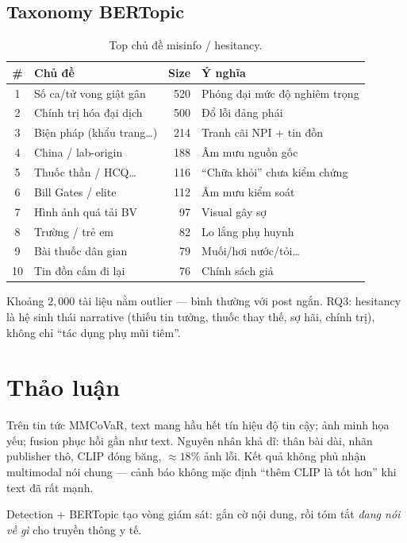 \documentclass[12pt, a4paper]{report}
\begin{document}
\subsection{Taxonomy BERTopic}

\begin{table}[htbp]
\centering
\caption{Top chủ đề misinfo / hesitancy.}
\label{tab:taxonomy}
\small
\begin{tabular}{clrp{4.8cm}}
\hline
\# & Chủ đề & Size & Ý nghĩa \\
\hline
1 & Số ca/tử vong giật gân & 520 & Phóng đại mức độ nghiêm trọng \\
2 & Chính trị hóa đại dịch & 500 & Đổ lỗi đảng phái \\
3 & Biện pháp (khẩu trang\ldots) & 214 & Tranh cãi NPI + tin đồn \\
4 & China / lab-origin & 188 & Âm mưu nguồn gốc \\
5 & Thuốc thần / HCQ\ldots & 116 & ``Chữa khỏi'' chưa kiểm chứng \\
6 & Bill Gates / elite & 112 & Âm mưu kiểm soát \\
7 & Hình ảnh quá tải BV & 97 & Visual gây sợ \\
8 & Trường / trẻ em & 82 & Lo lắng phụ huynh \\
9 & Bài thuốc dân gian & 79 & Muối/hơi nước/tỏi\ldots \\
10 & Tin đồn cấm đi lại & 76 & Chính sách giả \\
\hline
\end{tabular}
\end{table}

Khoảng $2{,}000$ tài liệu nằm outlier --- bình thường với post ngắn.
RQ3: hesitancy là hệ sinh thái narrative (thiếu tin tưởng, thuốc thay thế, sợ hãi, chính trị), không chỉ ``tác dụng phụ mũi tiêm''.

\section{Thảo luận}
\label{sec:discussion}

Trên tin tức MMCoVaR, text mang hầu hết tín hiệu độ tin cậy; ảnh minh họa yếu; fusion phục hồi gần như text.
Nguyên nhân khả dĩ: thân bài dài, nhãn publisher thô, CLIP đóng băng, $\approx 18\%$ ảnh lỗi.
Kết quả không phủ nhận multimodal nói chung --- cảnh báo không mặc định ``thêm CLIP là tốt hơn'' khi text đã rất mạnh.

Detection + BERTopic tạo vòng giám sát: gắn cờ nội dung, rồi tóm tắt \emph{đang nói về gì} cho truyền thông y tế.
\end{document}
